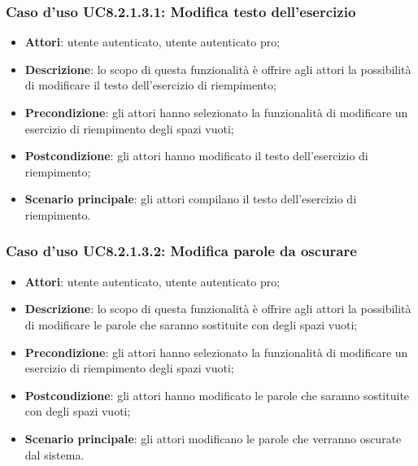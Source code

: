 \subsubsection{Caso d'uso UC8.2.1.3.1: Modifica testo dell'esercizio}
	\begin{itemize}
		\item
			\textbf{Attori}: utente autenticato, utente autenticato pro;
		\item		
			\textbf{Descrizione}: lo scopo di questa funzionalità è offrire agli attori la possibilità di modificare il testo dell'esercizio di riempimento;
		\item
			\textbf{Precondizione}: gli attori hanno selezionato la funzionalità di modificare un esercizio di riempimento degli spazi vuoti; 
		\item
			\textbf{Postcondizione}: gli attori hanno modificato il testo dell'esercizio di riempimento;
		\item
			\textbf{Scenario principale}: gli attori compilano il testo dell'esercizio di riempimento.
	\end{itemize}


\subsubsection{Caso d'uso UC8.2.1.3.2: Modifica parole da oscurare}
	\begin{itemize}
		\item
			\textbf{Attori}: utente autenticato, utente autenticato pro;
		\item		
			\textbf{Descrizione}: lo scopo di questa funzionalità è offrire agli attori la possibilità di modificare le parole che saranno sostituite con degli spazi vuoti;
		\item
			\textbf{Precondizione}: gli attori hanno selezionato la funzionalità di modificare un esercizio di riempimento degli spazi vuoti; 
		\item
			\textbf{Postcondizione}: gli attori hanno modificato le parole che saranno sostituite con degli spazi vuoti;
		\item
			\textbf{Scenario principale}: gli attori modificano le parole che verranno oscurate dal sistema.
	\end{itemize}